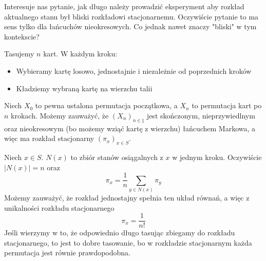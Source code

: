 Interesuje nas pytanie, jak długo należy prowadzić eksperyment aby rozkład aktualnego stanu był bliski rozkładowi stacjonarnemu. Oczywiście pytanie to ma sens tylko dla łańcuchów nieokresowych. Co jednak nawet znaczy "bliski" w tym kontekscie?

\begin{example}
	Tasujemy \(n\) kart. W każdym kroku:
	\begin{itemize}
		\item Wybieramy kartę losowo, jednostajnie i niezależnie od poprzednich kroków
		\item Kładziemy wybraną kartę na wierzchu talii
	\end{itemize}
	Niech \(X_0\) to pewna ustalona permutacja początkowa, a \(X_n\) to permutacja kart po \(n\) krokach. Możemy zauważyć, że \((X_n)_{n \in \natural}\) jest skończonym, nieprzywiedlnym oraz nieokresowym (bo możemy wziąć kartę z wierzchu) łańcuchem Markowa, a więc ma rozkład stacjonarny \((\pi_x)_{x \in S}\).

	Niech \(x \in S\). \(N(x)\) to zbiór stanów osiągalnych z \(x\) w jednym kroku. Oczywiście \(|N(x)| = n\) oraz
	\[
		\pi_x = \frac{1}{n} \sum_{y \in N(x)} \pi_y
	\]
	Możemy zauważyć, że rozkład jednostajny spełnia ten układ równań, a więc z unikalności rozkładu stacjonarnego
	\[
		\pi_x = \frac{1}{n!}
	\]
	Jeśli wierzymy w to, że odpowiednio długo tasując zbiegamy do rozkładu stacjonarnego, to jest to dobre tasowanie, bo w rozkładzie stacjonarnym każda permutacja jest równie prawdopodobna.
\end{example}